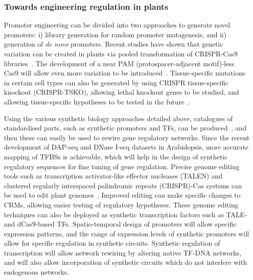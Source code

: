 \subsubsection{Towards engineering regulation in plants}\label{towards-engineering-regulation-in-plants}
Promoter engineering can be divided into two approaches to generate novel promoters: i) library generation for random promoter mutagenesis, and ii) generation of \textit{de novo} promoters.
Recent studies have shown that genetic variation can be created in plants via pooled transformation of CRISPR-Cas9 libraries~\autocite{jacobsGenerationCollectionMutant2017,luGenomewideTargetedMutagenesis2017,mengConstructionGenomeWideMutant2017,jacobsGenerationCollectionMutant2017,baiGenerationMultiplexMutagenesis2020}. The development of a near PAM (protospacer\hyp{}adjacent motif)\hyp{}less Cas9 will allow even more variation to be introduced~\autocite{waltonUnconstrainedGenomeTargeting2020}. Tissue\hyp{}specific mutations in certain cell types can also be generated by using CRISPR tissue-specific knockout (CRISPR-TSKO), allowing lethal knockout genes to be studied, and allowing tissue-specific hypotheses to be tested in the future~\autocite{decaesteckerCRISPRTSKOTechniqueEfficient2019}.

Using the various synthetic biology approaches detailed above, catalogues of standardised parts, such as synthetic promoters and TFs, can be produced~\autocite{patronStandardsPlantSynthetic2015}, and then these can easily be used to rewire gene regulatory networks.
Since the recent development of DAP\hyp{}seq and DNase I\hyp{}seq datasets in Arabidopsis, more accurate mapping of TFBSs is achievable, which will help in the design of synthetic regulatory sequences for fine tuning of gene regulation.
Precise genome editing tools such as transcription activator-like effector nucleases (TALEN) and clustered regularly interspaced palindromic repeats (CRISPR)-Cas systems can be used to edit plant genomes~\autocite{malzahnPlantGenomeEditing2017}.
Improved editing can make specific changes to CRMs, allowing easier testing of regulatory hypotheses.
These genome editing techniques can also be deployed as synthetic transcription factors such as TALE- and dCas9\hyp{}based TFs.
Spatio\hyp{}temporal design of promoters will allow specific expression patterns, and the range of expression levels of synthetic promoters will allow for specific regulation in synthetic circuits.
Synthetic regulation of transcription will allow network rewiring by altering native TF\hyp{}DNA networks, and will also allow incorporation of synthetic circuits which do not interfere with endogenous networks.

